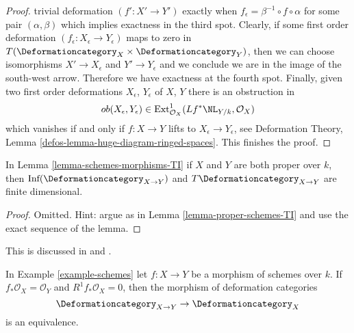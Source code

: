 \begin{proof}
trivial deformation $(f' : X' \to Y')$ exactly when
$f_\epsilon  = \beta^{-1} \circ f \circ \alpha$ for some
pair $(\alpha, \beta)$ which implies exactness in the third spot.
Clearly, if some first order deformation
$(f_\epsilon : X_\epsilon \to Y_\epsilon)$
maps to zero in $T(\Deformationcategory_X \times \Deformationcategory_Y)$,
then we can choose isomorphisms $X' \to X_\epsilon$ and $Y' \to Y_\epsilon$
and we conclude we are in the image of the south-west arrow.
Therefore we have exactness at the fourth spot.
Finally, given two first order deformations $X_\epsilon$, $Y_\epsilon$
of $X$, $Y$ there is an obstruction in
$$
ob(X_\epsilon, Y_\epsilon) \in
\text{Ext}^1_{\mathcal{O}_X}(Lf^*\NL_{Y/k}, \mathcal{O}_X)
$$
which vanishes if and only if $f : X \to Y$ lifts to
$X_\epsilon \to Y_\epsilon$, see
Deformation Theory, Lemma \ref{defos-lemma-huge-diagram-ringed-spaces}.
This finishes the proof.
\end{proof}

\begin{lemma}
\label{lemma-proper-schemes-morphisms-TI}
In Lemma \ref{lemma-schemes-morphisms-TI} if $X$ and $Y$ are both
proper over $k$, then
$\text{Inf}(\Deformationcategory_{X \to Y})$ and
$T\Deformationcategory_{X \to Y}$ are finite dimensional.
\end{lemma}

\begin{proof}
Omitted. Hint: argue as in Lemma \ref{lemma-proper-schemes-TI}
and use the exact sequence of the lemma.
\end{proof}

\begin{lemma}
\label{lemma-schemes-morphisms-smooth-to-base}
\begin{reference}
This is discussed in \cite[Section 5.3]{Ravi-Murphys-Law} and
\cite[Theorem 3.3]{Ran-deformations}.
\end{reference}
In Example \ref{example-schemes} let $f : X \to Y$ be a morphism of schemes
over $k$. If $f_*\mathcal{O}_X = \mathcal{O}_Y$ and $R^1f_*\mathcal{O}_X = 0$,
then the morphism of deformation categories
$$
\Deformationcategory_{X \to Y} \to \Deformationcategory_X
$$
is an equivalence.
\end{lemma}

